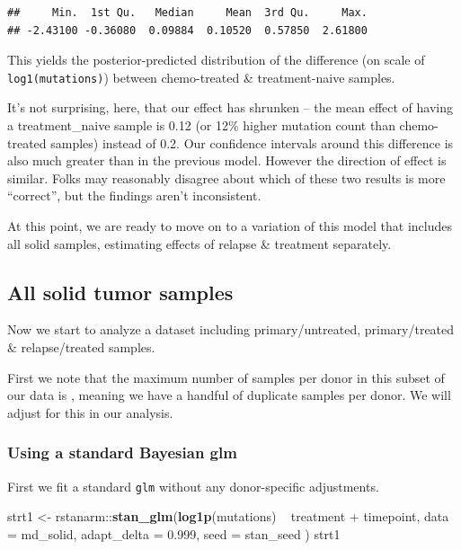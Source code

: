 \documentclass[]{article}
\newenvironment{Shaded}{\begin{snugshade}}{\end{snugshade}}
\newcommand{\KeywordTok}[1]{\textcolor[rgb]{0.13,0.29,0.53}{\textbf{{#1}}}}
\newcommand{\DataTypeTok}[1]{\textcolor[rgb]{0.13,0.29,0.53}{{#1}}}
\newcommand{\FloatTok}[1]{\textcolor[rgb]{0.00,0.00,0.81}{{#1}}}
\newcommand{\StringTok}[1]{\textcolor[rgb]{0.31,0.60,0.02}{{#1}}}
\newcommand{\NormalTok}[1]{{#1}}
\begin{document}
\begin{verbatim}
##     Min.  1st Qu.   Median     Mean  3rd Qu.     Max. 
## -2.43100 -0.36080  0.09884  0.10520  0.57850  2.61800
\end{verbatim}

This yields the posterior-predicted distribution of the difference (on
scale of \texttt{log1(mutations)}) between chemo-treated \&
treatment-naive samples.

It's not surprising, here, that our effect has shrunken -- the mean
effect of having a treatment\_naive sample is 0.12 (or 12\% higher
mutation count than chemo-treated samples) instead of 0.2. Our
confidence intervals around this difference is also much greater than in
the previous model. However the direction of effect is similar. Folks
may reasonably disagree about which of these two results is more
``correct'', but the findings aren't inconsistent.

At this point, we are ready to move on to a variation of this model that
includes all solid samples, estimating effects of relapse \& treatment
separately.

\subsection{All solid tumor samples}\label{all-solid-tumor-samples}

Now we start to analyze a dataset including primary/untreated,
primary/treated \& relapse/treated samples.

First we note that the maximum number of samples per donor in this
subset of our data is , meaning we have a handful of duplicate samples
per donor. We will adjust for this in our analysis.

\subsubsection{Using a standard Bayesian
glm}\label{using-a-standard-bayesian-glm}

First we fit a standard \texttt{glm} without any donor-specific
adjustments.

\begin{Shaded}
\begin{Highlighting}[]
\NormalTok{strt1 <-}\StringTok{ }\NormalTok{rstanarm::}\KeywordTok{stan_glm}\NormalTok{(}\KeywordTok{log1p}\NormalTok{(mutations) ~}\StringTok{ }\NormalTok{treatment +}\StringTok{ }\NormalTok{timepoint,}
                           \DataTypeTok{data =} \NormalTok{md_solid, }
                           \DataTypeTok{adapt_delta =} \FloatTok{0.999}\NormalTok{,}
                           \DataTypeTok{seed =} \NormalTok{stan_seed}
                           \NormalTok{)}
\NormalTok{strt1}
\end{Highlighting}
\end{Shaded}
\end{document}
